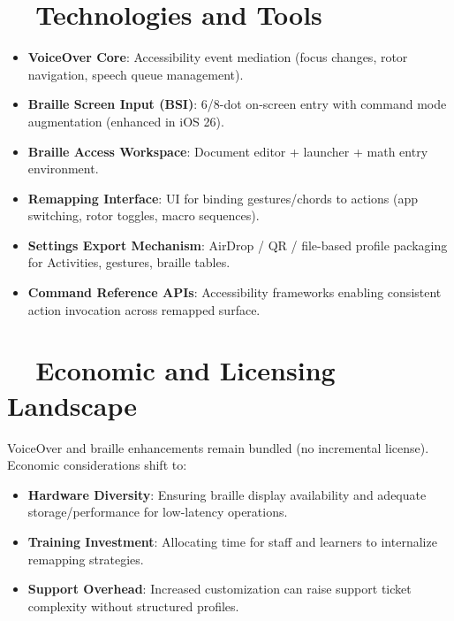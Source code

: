 \section{~~Technologies and Tools}
\label{sec:sr30-technologies}
\begin{itemize}
	\item \textbf{VoiceOver Core}: Accessibility event mediation (focus changes, rotor navigation, speech queue management)\supercite{applevisVO2024}.
	\item \textbf{Braille Screen Input (BSI)}: 6/8-dot on-screen entry with command mode augmentation (enhanced in iOS 26)\supercite{appleSupportBSI2025}.
	\item \textbf{Braille Access Workspace}: Document editor + launcher + math entry environment\supercite{myvision2025}.
	\item \textbf{Remapping Interface}: UI for binding gestures/chords to actions (app switching, rotor toggles, macro sequences)\supercite{hks2025}.
	\item \textbf{Settings Export Mechanism}: AirDrop / QR / file-based profile packaging for Activities, gestures, braille tables\supercite{myvision2025}.
	\item \textbf{Command Reference APIs}: Accessibility frameworks enabling consistent action invocation across remapped surface.
\end{itemize}

\section{~~Economic and Licensing Landscape}
\label{sec:sr30-economics}
VoiceOver and braille enhancements remain bundled (no incremental license). Economic considerations shift to:
\begin{itemize}
	\item \textbf{Hardware Diversity}: Ensuring braille display availability and adequate storage/performance for low-latency operations.
	\item \textbf{Training Investment}: Allocating time for staff and learners to internalize remapping strategies.
	\item \textbf{Support Overhead}: Increased customization can raise support ticket complexity without structured profiles.
\end{itemize}

